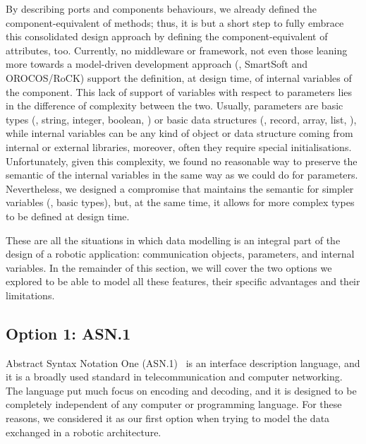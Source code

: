 By describing ports and components behaviours, we already defined the component-equivalent of methods; thus, it is but a short step to fully embrace this consolidated design approach by defining the component-equivalent of attributes, too. Currently, no middleware or framework, not even those leaning more towards a model-driven development approach (\ie, SmartSoft and OROCOS/RoCK) support the definition, at design time, of internal variables of the component. This lack of support of variables with respect to parameters lies in the difference of complexity between the two. Usually, parameters are basic types (\eg, string, integer, boolean, \etc) or basic data structures (\eg, record, array, list, \etc), while internal variables can be any kind of object or data structure coming from internal or external libraries, moreover, often they require special initialisations. Unfortunately, given this complexity, we found no reasonable way to preserve the semantic of the internal variables in the same way as we could do for parameters. Nevertheless, we designed a compromise that maintains the semantic for simpler variables (\ie, basic types), but, at the same time, it allows for more complex types to be defined at design time.

These are all the situations in which data modelling is an integral part of the design of a robotic application: communication objects, parameters, and internal variables. In the remainder of this section, we will cover the two options we explored to be able to model all these features, their specific advantages and their limitations.

\subsection{Option 1: ASN.1}
Abstract Syntax Notation One (ASN.1)~\cite{dubuisson2000asn} is an interface description language, and it is a broadly used standard in telecommunication and computer networking. The language put much focus on encoding and decoding, and it is designed to be completely independent of any computer or programming language. For these reasons, we considered it as our first option when trying to model the data exchanged in a robotic architecture.


